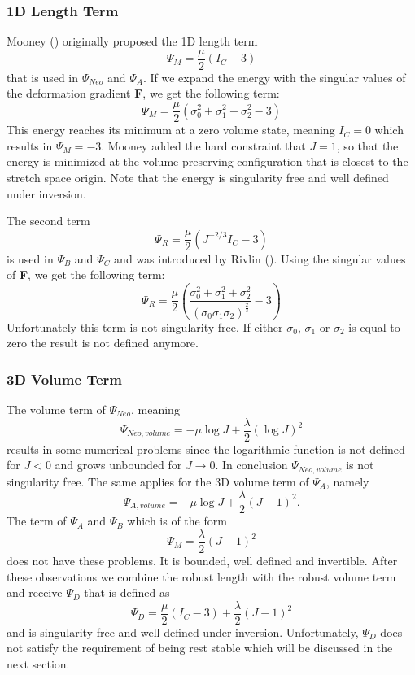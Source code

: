 \subsubsection{1D Length Term}
Mooney (\cite{mooney1940theory}) originally proposed the 1D length term 
\[
\Psi_{M}=\frac{\mu}{2}\left(I_{C}-3\right)
\]
that is used in $\Psi_{Neo}$ and $\Psi_{A}$. If we expand the energy with the singular values of the deformation gradient \textbf{F}, we get the following term:
\[
\Psi_{M}=\frac{\mu}{2}\left(\sigma_{0}^2 + \sigma_{1}^2 + \sigma_{2}^2 - 3\right)
\]
This energy reaches its minimum at a zero volume state, meaning $I_{C}=0$ which results in $\Psi_{M}=-3$. Mooney added the hard constraint that $J=1$, so that the energy is minimized at the volume preserving configuration that is closest to the stretch space origin. Note that the energy is singularity free and well defined under inversion.

The second term 
\[
\Psi_{R} = \frac{\mu}{2}\left(J^{-2 / 3} I_{C}-3\right)
\]
is used in $\Psi_{B}$ and $\Psi_{C}$ and was introduced by Rivlin (\cite{rivlin1948large}). Using the singular values of \textbf{F}, we get the following term:
\[
\Psi_{R} = \frac{\mu}{2}\left(\frac{\sigma_{0}^2 + \sigma_{1}^2 + \sigma_{2}^2}{(\sigma_{0}  \sigma_{1}  \sigma_{2})^\frac{2}{3}}
 - 3\right)
\]
Unfortunately this term is not singularity free. If either $\sigma_{0}$, $\sigma_{1}$ or $\sigma_{2}$ is equal to zero the result is not defined anymore.

\subsubsection{3D Volume Term}
The volume term of $\Psi_{Neo}$, meaning
\[
\Psi_{Neo, volume} = -\mu \log J+\frac{\lambda}{2}(\log J)^{2}
\]
results in some numerical problems since the logarithmic function is not defined for $J<0$ and grows unbounded for $J \rightarrow 0$. In conclusion $\Psi_{Neo, volume}$ is not singularity free. 
The same applies for the 3D volume term of $\Psi_{A}$, namely
\[
\Psi_{A, volume} = -\mu \log J+\frac{\lambda}{2}(J-1)^{2}.
\]
The term of $\Psi_{A}$ and $\Psi_{B}$ which is of the form
\[
\Psi_{M} = \frac{\lambda}{2}(J-1)^{2}
\]
does not have these problems. It is bounded, well defined and invertible. After these observations we combine the robust length with the robust volume term and receive $\Psi_D$ that is defined as
\[
\Psi_{D} = \frac{\mu}{2}\left(I_{C}-3\right) +\frac{\lambda}{2}(J-1)^{2}
\]
and is singularity free and well defined under inversion. Unfortunately, $\Psi_D$ does not satisfy the requirement of being rest stable which will be discussed in the next section.

